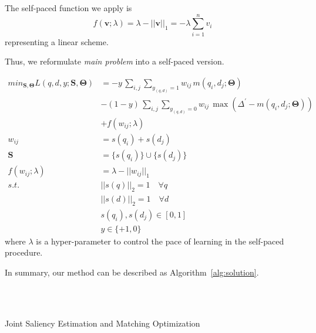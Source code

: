 The self-paced function we apply is 
\begin{equation}
f(\mathbf{v};\lambda) = \lambda-||\mathbf{v}||_1 = -\lambda\sum_{i=1}^n v_i
\end{equation}
representing a linear scheme. 

Thus, we reformulate \emph{main problem} into a self-paced version. 

\begin{equation*}
\begin{aligned}
min_{\mathbf{S}, \mathbf{\Theta}} L(q, d, y; \mathbf{S}, \mathbf{\Theta}) &= -y\, \sum_{i, j}\sum_{y_{(q, d)}=1} w_{ij}\, m(q_i, d_j; \mathbf{\Theta}) \\
& - (1-y)\, \sum_{i, j}\sum_{y_{(q, d)}=0} w_{ij}\, \max(\Delta^{'}-m(q_i, d_j; \mathbf{\Theta}))\\
& + f(w_{ij}; \lambda) \\
w_{ij} &= s(q_i) + s(d_j)\\
\mathbf{S} &= \{s(q_i)\} \cup \{s(d_j)\}\\  
f(w_{ij}; \lambda) &= \lambda - ||w_{ij}||_1 \\
s.t. & ||s(q)||_2 = 1 \quad \forall q\\
& ||s(d)||_2 = 1 \quad \forall d\\
& s(q_i), s(d_j) \in [0,1] \\
& y\in \{+1, 0\}
\end{aligned}
\end{equation*}
where $\lambda$ is a hyper-parameter to control the pace of learning in the self-paced procedure. 

In summary, our method can be described as Algorithm~\ref{alg:solution}.
\begin{algorithm}
\begin{algorithmic}[1]  
\\
~\\
\ENDWHILE
{}
\end{algorithmic}
\caption{Joint Saliency Estimation and Matching Optimization}
\label{alg:solution}
\end{algorithm}

